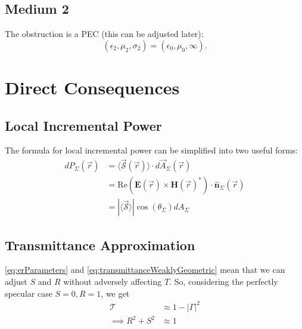 \documentclass{article}
\begin{document}
\subsection{Medium 2}
The obstruction is a PEC (this can be adjusted later):
\begin{equation}
   (\epsilon_2, \mu_2, \sigma_2) = (\epsilon_0, \mu_0, \infty).
   \label{eq:medium2}
\end{equation}

\setcounter{section}{3}   %
\setcounter{subsection}{0}
\setcounter{equation}{0}  %
\section{Direct Consequences}
\subsection{Local Incremental Power}
The formula for local incremental power can be simplified into two useful forms:
\begin{subequations}
\begin{align}
   dP_{\Sigma}(\vec{r}) &= \langle \vec{{\mathcal{S} }}(\vec{r}) \rangle \cdot d
      \vec{A}_{\Sigma} ( \vec{r} ) \nonumber \\
   &= \text{Re}( \mathbf{E}(\vec{r}) \times \mathbf{H}(\vec{r})^{*} ) \cdot
      \hat{\mathbf{n}}_{\Sigma}(\vec{r}) \\
   &= | \langle \vec{\mathcal{S}} \rangle | \cos( \theta_{\Sigma} )
      dA_{\Sigma} 
      \label{eq:localIncrementalPowerPoynting}
\end{align}
\end{subequations}
\subsection{Transmittance Approximation}
\eqref{eq:erParameters} and \eqref{eq:transmittanceWeaklyGeometric} mean that we can
adjust $S$ and $R$ without adversely affecting $T$. So, considering the perfectly
specular case $S=0, R=1$, we get
\begin{align}
   \mathcal{T} &\approx 1 - | \Gamma |^2 \nonumber \\
   \implies R^2 + S^2 & \approx 1 
   \label{eq:RApprox}
\end{align}

\renewcommand{\thesection}{\arabic{section}}
\setcounter{section}{0}
\setcounter{equation}{0}
\end{document}
